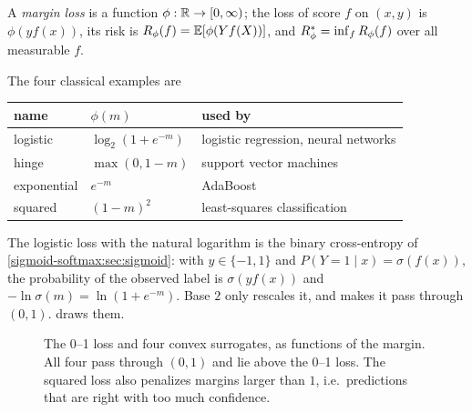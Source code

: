 \begin{notechapter}
\begin{definition}
A \emph{margin loss} is a function $\phi:\mathbb{R}\to[0,\infty)$; the loss of score $f$ on $(x, y)$ is $\phi(yf(x))$,
its risk is $R_\phi(f) = \mathbb{E}[\phi(Yf(X))]$, and $R_\phi^* = \inf_fR_\phi(f)$ over all measurable $f$.
\end{definition}

The four classical examples are
\begin{center}
\begin{tabular}{@{}lll@{}}
\toprule
name & $\phi(m)$ & used by \\
\midrule
logistic & $\log_2(1 + e^{-m})$ & logistic regression, neural networks \\
hinge & $\max(0, 1 - m)$ & support vector machines \\
exponential & $e^{-m}$ & AdaBoost \\
squared & $(1 - m)^2$ & least-squares classification \\
\bottomrule
\end{tabular}
\end{center}
The logistic loss with the natural logarithm is the binary cross-entropy of
\cref{sigmoid-softmax:sec:sigmoid}: with $y\in\{-1, 1\}$ and $P(Y = 1\mid x) = \sigma(f(x))$, the probability of
the observed label is $\sigma(yf(x))$ and $-\ln\sigma(m) = \ln(1 + e^{-m})$. Base $2$ only rescales it, and
makes it pass through $(0, 1)$.  draws them.

\begin{figure}[ht]
\centering
{}
\caption{The 0--1 loss and four convex surrogates, as functions of the margin.
All four pass through $(0, 1)$ and lie above the 0--1 loss. The squared loss also
penalizes margins larger than $1$, i.e.\ predictions that are right with too much
confidence.}
\label{surrogate-losses:fig:losses}
\end{figure}


\end{notechapter}
